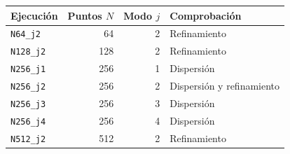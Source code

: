 \begin{tabular}{lrrl}
\toprule
Ejecución & Puntos $N$ & Modo $j$ & Comprobación \\
\midrule
\texttt{N64\_j2} & 64 & 2 & Refinamiento \\
\texttt{N128\_j2} & 128 & 2 & Refinamiento \\
\texttt{N256\_j1} & 256 & 1 & Dispersión \\
\texttt{N256\_j2} & 256 & 2 & Dispersión y refinamiento \\
\texttt{N256\_j3} & 256 & 3 & Dispersión \\
\texttt{N256\_j4} & 256 & 4 & Dispersión \\
\texttt{N512\_j2} & 512 & 2 & Refinamiento \\
\bottomrule
\end{tabular}
